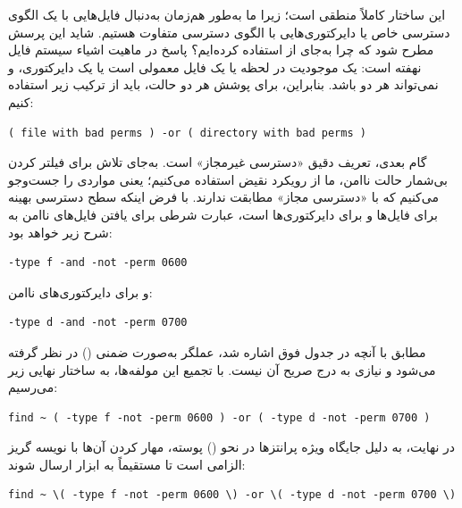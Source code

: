 این ساختار کاملاً منطقی است؛ زیرا ما به‌طور هم‌زمان به‌دنبال فایل‌هایی با یک الگوی دسترسی خاص یا دایرکتوری‌هایی با الگوی دسترسی متفاوت هستیم. شاید این پرسش مطرح شود که چرا به‌جای  از  استفاده کرده‌ایم؟ پاسخ در ماهیت اشیاء سیستم فایل نهفته است: یک موجودیت در لحظه یا یک فایل معمولی است یا یک دایرکتوری، و نمی‌تواند هر دو باشد. بنابراین، برای پوشش هر دو حالت، باید از ترکیب زیر استفاده کنیم:

\begin{latin}
\begin{lstlisting}
( file with bad perms ) -or ( directory with bad perms )
\end{lstlisting}
\end{latin}

گام بعدی، تعریف دقیق «دسترسی غیرمجاز» است. به‌جای تلاش برای فیلتر کردن بی‌شمار حالت ناامن، ما از رویکرد نقیض استفاده می‌کنیم؛ یعنی مواردی را جست‌وجو می‌کنیم که با «دسترسی مجاز» مطابقت ندارند. با فرض اینکه سطح دسترسی بهینه برای فایل‌ها  و برای دایرکتوری‌ها  است، عبارت شرطی برای یافتن فایل‌های ناامن به شرح زیر خواهد بود:

\begin{latin}
\begin{lstlisting}
-type f -and -not -perm 0600
\end{lstlisting}
\end{latin}

و برای دایرکتوری‌های ناامن:

\begin{latin}
\begin{lstlisting}
-type d -and -not -perm 0700
\end{lstlisting}
\end{latin}

مطابق با آنچه در جدول فوق اشاره شد، عملگر  به‌صورت ضمنی () در نظر گرفته می‌شود و نیازی به درج صریح آن نیست. با تجمیع این مولفه‌ها، به ساختار نهایی زیر می‌رسیم:

\begin{latin}
\begin{lstlisting}
find ~ ( -type f -not -perm 0600 ) -or ( -type d -not -perm 0700 )
\end{lstlisting}
\end{latin}

در نهایت، به دلیل جایگاه ویژه پرانتزها در نحو () پوسته، مهار کردن آن‌ها با نویسه گریز \cmd{\textbackslash} الزامی است تا مستقیماً به ابزار  ارسال شوند:

\begin{latin}
\begin{lstlisting}
find ~ \( -type f -not -perm 0600 \) -or \( -type d -not -perm 0700 \)
\end{lstlisting}
\end{latin}

